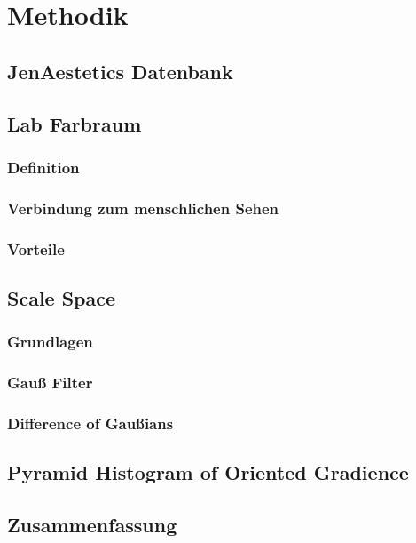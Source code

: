 \chapter{Methodik}

\blindtext

\section{JenAestetics Datenbank}

\blindtext

\section{Lab Farbraum}

\blindtext

\subsection{Definition}

\blindtext

\subsection{Verbindung zum menschlichen Sehen}

\blindtext

\subsection{Vorteile}

\blindtext

\section{Scale Space}

\blindtext

\subsection{Grundlagen}

\blindtext

\subsection{Gauß Filter}

\blindtext

\subsection{Difference of Gaußians}

\blindtext

\section{Pyramid Histogram of Oriented Gradience}

\blindtext

\section{Zusammenfassung}

\blindtext

